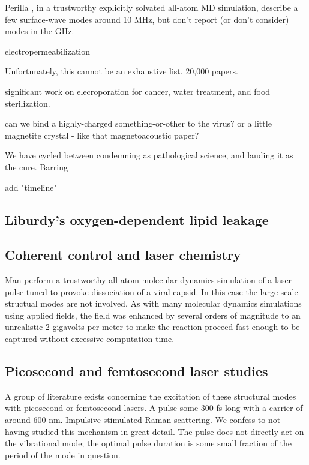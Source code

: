 \documentclass[paper.tex]{subfiles}
\begin{document}
\begin{multicols}{1}
Perilla \cite{}, in a trustworthy explicitly solvated all-atom MD simulation, describe a few surface-wave modes around 10 MHz, but don't report (or don't consider) modes in the GHz.




electropermeabilization




Unfortunately, this cannot be an exhaustive list. 20,000 papers.

significant work on elecroporation for cancer, water treatment, and food sterilization.


can we bind a highly-charged something-or-other to the virus?
or a little magnetite crystal - like that magnetoacoustic paper?


We have cycled between condemning as pathological science, and lauding it as the cure. Barring 


add "timeline"



\subsection{Liburdy's oxygen-dependent lipid leakage}
\label{sec:liburdy}


\subsection{Coherent control and laser chemistry}


Man \cite{Picosecond2016b} perform a trustworthy all-atom molecular dynamics simulation of a laser pulse tuned to provoke dissociation of a viral capsid. In this case the large-scale structual modes are not involved. As with many molecular dynamics simulations using applied fields, the field was enhanced by several orders of magnitude to an unrealistic 2 gigavolts per meter to make the reaction proceed fast enough to be captured without excessive computation time.


\subsection{Picosecond and femtosecond laser studies}

A group of literature exists concerning the excitation of these structural modes with picosecond or femtosecond lasers. A pulse some 300 fs long with a carrier of around 600 nm. Impulsive stimulated Raman scattering. We confess to not having studied this mechanism in great detail. The pulse does not directly act on the vibrational mode; the optimal pulse duration is some small fraction of the period of the mode in question.


\end{multicols}
\end{document}
